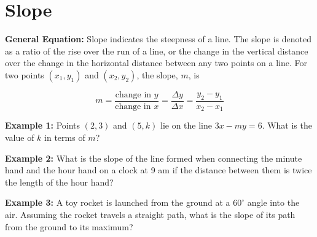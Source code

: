 \section{Slope}

\textbf{General Equation:} Slope indicates the steepness of a line. The slope is denoted as a ratio of the rise over the run of a line, or the change in the vertical distance over the change in the horizontal distance between any two points on a line. For two points $(x_1,y_1)$ and $(x_2,y_2)$, the slope, $m$, is

\[m=\frac{\textrm{change in }y}{\textrm{change in }x}=\frac{\Delta y}{\Delta x}=\frac{y_2-y_1}{x_2-x_1}\]

\vfill\textbf{Example 1:} Points $(2,3)$ and $(5,k)$ lie on the line $3x-my=6$. What is the value of $k$ in terms of $m$?

\vfill\textbf{Example 2:} What is the slope of the line formed when connecting the minute hand and the hour hand on a clock at 9 am if the distance between them is twice the length of the hour hand?

\vfill\textbf{Example 3:} A toy rocket is launched from the ground at a $60^\circ$ angle into the air. Assuming the rocket travels a straight path, what is the slope of its path from the ground to its maximum?

